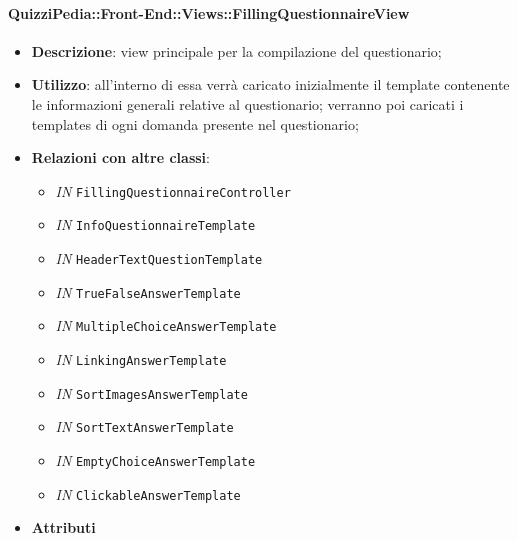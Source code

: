 \paragraph{QuizziPedia::Front-End::Views::FillingQuestionnaireView}
\begin{itemize}
	\item \textbf{Descrizione}: view principale per la compilazione del questionario;
	\item \textbf{Utilizzo}: all'interno di essa verrà caricato inizialmente il template contenente le informazioni generali relative al questionario; verranno poi caricati i templates di ogni domanda presente nel questionario;
	\item \textbf{Relazioni con altre classi}: 
	\begin{itemize}
		\item \textit{IN} \texttt{FillingQuestionnaireController} \\
		\item \textit{IN} \texttt{InfoQuestionnaireTemplate} \\
		\item \textit{IN} \texttt{HeaderTextQuestionTemplate} \\
		\item \textit{IN} \texttt{TrueFalseAnswerTemplate} \\
		\item \textit{IN} \texttt{MultipleChoiceAnswerTemplate} \\
		\item \textit{IN} \texttt{LinkingAnswerTemplate} \\
		\item \textit{IN} \texttt{SortImagesAnswerTemplate} \\
		\item \textit{IN} \texttt{SortTextAnswerTemplate} \\
		\item \textit{IN} \texttt{EmptyChoiceAnswerTemplate} \\
		\item \textit{IN} \texttt{ClickableAnswerTemplate} \\
	\end{itemize}
	\item \textbf{Attributi}
\end{itemize}

